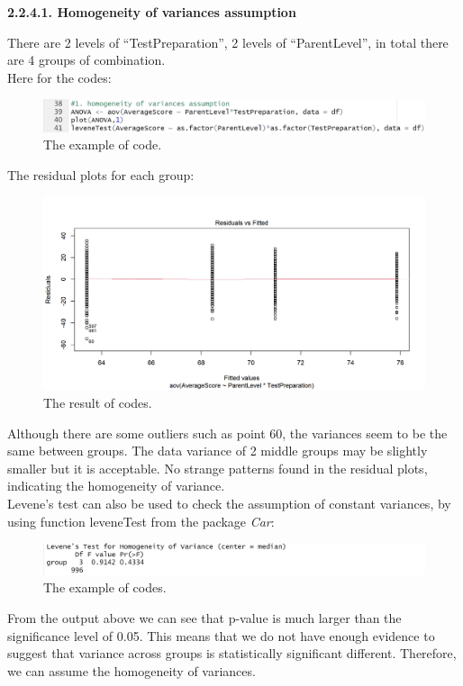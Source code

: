 \documentclass[a4paper]{article}
\begin{document}

\textbf{2.2.4.1. Homogeneity of variances assumption} \\ \newline
{}
There are 2 levels of “TestPreparation”, 2 levels of “ParentLevel”, in total there are 4 groups of combination. \\ \newline 
Here for the codes: 
\begin{figure}[H]
    \centering
    \includegraphics[scale = 0.6]{Images/Activity2/22.png}
    \caption{The example of code.}
    \label{fig:model1}
\end{figure}
The residual plots for each group:
\begin{figure}[H]
    \centering
    \includegraphics[scale = 0.7]{Images/Activity2/23.png}
    \caption{The result of codes.}
    \label{fig:model2}
\end{figure}
Although there are some outliers such as point 60, the variances seem to be the same between groups. The data variance of 2 middle groups may be slightly smaller but it is acceptable. No strange patterns found in the residual plots, indicating the homogeneity of variance. \\ \newline
Levene’s test can also be used to check the assumption of constant variances, by using function leveneTest from the package \textit{Car}:
\begin{figure}[H]
    \centering
    \includegraphics[scale = 0.7]{Images/Activity2/24.png}
    \caption{The example of codes.}
    \label{fig:model3}
\end{figure}
From the output above we can see that p-value is much larger than the significance level of
0.05. This means that we do not have enough evidence to suggest that variance across groups is
statistically significant different. Therefore, we can assume the homogeneity of variances. \\ \newline
\end{document}
